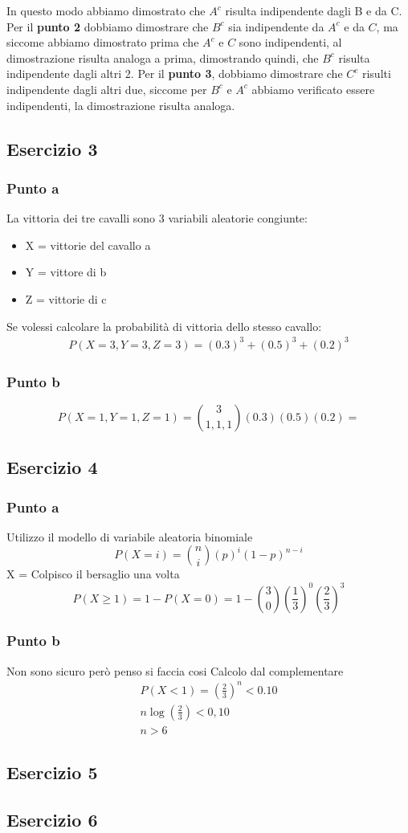 \documentclass[12pt]{article}
\begin{document}
\newpage
In questo modo abbiamo dimostrato che \(A^c\) risulta indipendente dagli B e da C.
\newline
Per il \textbf{punto 2} dobbiamo dimostrare che \(B^c\) sia indipendente da \(A^c\) e da \(C\), ma siccome
abbiamo dimostrato prima che \(A^c\) e \(C\) sono indipendenti, al dimostrazione risulta analoga a prima, dimostrando quindi,
che \(B^c\) risulta indipendente dagli altri 2. 
Per il \textbf{punto 3}, dobbiamo dimostrare che \(C^c\) risulti indipendente dagli altri due, siccome per
\(B^c\) e \(A^c\) abbiamo verificato essere indipendenti, la dimostrazione risulta analoga.
\subsection*{Esercizio 3}
\subsubsection*{Punto a}

La vittoria dei tre cavalli sono 3 variabili aleatorie congiunte:
\begin{itemize}
    \item X = vittorie del cavallo a
    \item Y = vittore di b
    \item Z = vittorie di c
\end{itemize}

Se volessi calcolare la probabilità di vittoria dello stesso cavallo:
\begin{align*}
    P(X=3,Y=3,Z=3) = (0.3)^3 + (0.5)^3 + (0.2)^3
\end{align*}

\subsubsection*{Punto b}
\[
    P(X=1,Y=1,Z=1) = \binom{3}{1,1,1}(0.3) (0.5) (0.2) =    
\]
\subsection*{Esercizio 4}
\subsubsection*{Punto a}
Utilizzo il modello di variabile aleatoria binomiale
\[
P(X=i) = \binom{n}{i} (p)^i (1-p)^{n-i}    
\]
X = Colpisco il bersaglio una volta
\[
P(X \ge 1) = 1 - P(X=0) = 1 - \binom{3}{0} (\frac{1}{3})^0 (\frac{2}{3})^3   
\]  

\subsubsection*{Punto b}
Non sono sicuro però penso si faccia cosi
\newline
Calcolo dal complementare
\begin{align*}
    P(X<1) = \left(\frac{2}{3}\right)^n < 0.10 \\
    n\log(\frac{2}{3}) < 0,10 \\
    n > 6
\end{align*}

\subsection*{Esercizio 5}

\subsection*{Esercizio 6}
\end{document}

